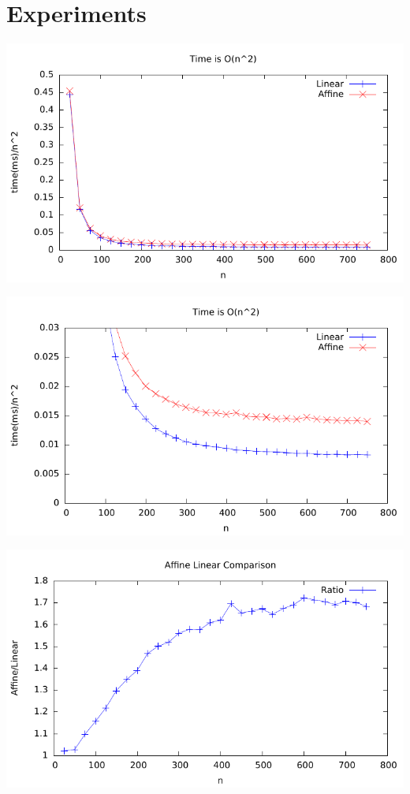 \section{Experiments}

\begin{center}
	\includegraphics[width=\textwidth]{../plots/plot1.pdf}
\end{center}

\begin{center}
	\includegraphics[width=\textwidth]{../plots/plot2.pdf}
\end{center}

\begin{center}
	\includegraphics[width=\textwidth]{../plots/plot3.pdf}
\end{center}
